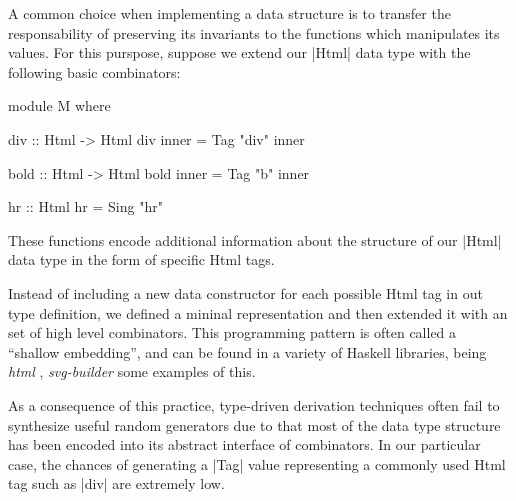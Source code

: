 A common choice when implementing a data structure is to transfer the
responsability of preserving its invariants to the functions which manipulates
its values.
%
For this purspose, suppose we extend our |Html| data type with the following
basic combinators:
%
\begin{code}
module M where

  div :: Html -> Html
  div inner = Tag "div" inner

  bold :: Html -> Html
  bold inner = Tag "b" inner

  hr :: Html
  hr = Sing "hr"
\end{code}
%
%
These functions encode additional information about the structure of our |Html|
data type in the form of specific Html tags.


Instead of including a new data constructor for each possible Html tag in out
type definition, we defined a mininal representation and then extended it with
an set of high level combinators.
%
%
This programming pattern is often called a ``shallow embedding'', and can be
found in a variety of Haskell libraries, being \emph{html} \tocite,
\emph{svg-builder} \tocite some examples of this.


As a consequence of this practice, type-driven derivation techniques often fail
to synthesize useful random generators due to that most of the data type
structure has been encoded into its abstract interface of combinators.
%
In our particular case, the chances of generating a |Tag| value representing a
commonly used Html tag such as |div| are extremely low.




